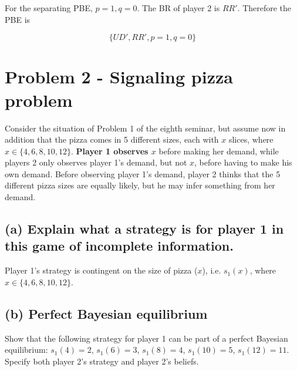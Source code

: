 \documentclass{article}
\begin{document}
For the separating PBE, $p=1,q=0$. The BR of player 2 is
$RR'$. Therefore the PBE is

$$\{UD',RR',p=1,q=0\}$$

\section{Problem 2 - Signaling pizza problem}

Consider the situation of Problem 1 of the eighth seminar, but assume now in addition that the pizza comes in 5
different sizes, each with $x$ slices, where $x \in \{4, 6, 8, 10, 12\}$. \textbf{Player 1 observes $x$}
before making her demand, while players 2 only observes player 1's demand, but not $x$, before
having to make his own demand. Before observing player 1's demand, player 2 thinks that the 5
different pizza sizes are equally likely, but he may infer something from her demand.
%
\subsection*{(a) Explain what a strategy is for player 1 in this game of incomplete information.} 
%
Player 1's strategy is contingent on the size of pizza ($x$), i.e. $s_1(x)$, 
where $x \in \{4, 6, 8, 10, 12\}$.

\subsection*{(b) Perfect Bayesian
equilibrium} Show that the following strategy for player 1 can be part of a perfect Bayesian
equilibrium: $s_1(4) = 2$, $s_1(6) = 3$, $s_1(8) = 4$, $s_1(10) = 5$, $s_1(12) = 11$. Specify
both player 2's strategy and player 2's beliefs. 
%
\end{document}
